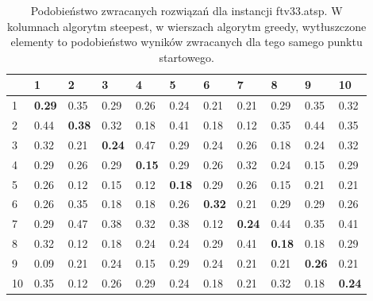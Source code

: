\begin{table}[h!]
	\centering
       \begin{tabular}{|l|l|l|l|l|l|l|l|l|l|l|}
        \hline
		& 1 & 2 & 3 & 4 & 5 & 6 & 7 & 8 & 9 & 10 \\
		\hline
		1 & \textbf{0.29} & 0.35 & 0.29 & 0.26 & 0.24 & 0.21 & 0.21 & 0.29 & 0.35 & 0.32 \\    
		2 & 0.44 & \textbf{0.38} & 0.32 & 0.18 & 0.41 & 0.18 & 0.12 & 0.35 & 0.44 & 0.35 \\    
		3 & 0.32 & 0.21 & \textbf{0.24} & 0.47 & 0.29 & 0.24 & 0.26 & 0.18 & 0.24 & 0.32 \\ 
		4 &	0.29 & 0.26 & 0.29 & \textbf{0.15} & 0.29 & 0.26 & 0.32 & 0.24 & 0.15 & 0.29 \\   
		5 & 0.26 & 0.12 & 0.15 & 0.12 & \textbf{0.18} & 0.29 & 0.26 & 0.15 & 0.21 & 0.21 \\   
		6 & 0.26 & 0.35 & 0.18 & 0.18 & 0.26 & \textbf{0.32} & 0.21 & 0.29 & 0.29 & 0.26 \\   
		7 & 0.29 & 0.47 & 0.38 & 0.32 & 0.38 & 0.12 & \textbf{0.24} & 0.44 & 0.35 & 0.41 \\   
		8 & 0.32 & 0.12 & 0.18 & 0.24 & 0.24 & 0.29 & 0.41 & \textbf{0.18} & 0.18 & 0.29 \\   
		9 & 0.09 & 0.21 & 0.24 & 0.15 & 0.29 & 0.24 & 0.21 & 0.21 & \textbf{0.26} & 0.21 \\   
		10 & 0.35 & 0.12 & 0.26 & 0.29 & 0.24 & 0.18 & 0.21 & 0.32 & 0.18 & \textbf{0.24} \\
		\hline
		\end{tabular}
		\caption{Podobieństwo zwracanych rozwiązań dla instancji ftv33.atsp. W kolumnach algorytm steepest, w wierszach algorytm greedy, wytłuszczone elementy to podobieństwo wyników zwracanych dla tego samego punktu startowego.}
		\label{tab:sim_33}
\end{table}

